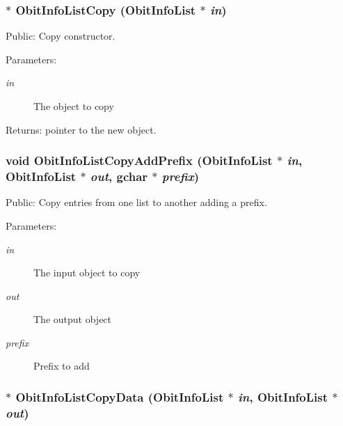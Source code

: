 \subsubsection{$\ast$ Obit\-Info\-List\-Copy ({\bf Obit\-Info\-List} $\ast$ {\em in})}\label{ObitInfoList_8c_a4}


Public: Copy constructor. 

\begin{Desc}
\item[Parameters:]
\begin{description}
\item[{\em in}]The object to copy \end{description}
\end{Desc}
\begin{Desc}
\item[Returns:]pointer to the new object. \end{Desc}
\subsubsection{\setlength{\rightskip}{0pt plus 5cm}void Obit\-Info\-List\-Copy\-Add\-Prefix ({\bf Obit\-Info\-List} $\ast$ {\em in}, {\bf Obit\-Info\-List} $\ast$ {\em out}, gchar $\ast$ {\em prefix})}\label{ObitInfoList_8c_a10}


Public: Copy entries from one list to another adding a prefix. 

\begin{Desc}
\item[Parameters:]
\begin{description}
\item[{\em in}]The input object to copy \item[{\em out}]The output object \item[{\em prefix}]Prefix to add \end{description}
\end{Desc}
\subsubsection{$\ast$ Obit\-Info\-List\-Copy\-Data ({\bf Obit\-Info\-List} $\ast$ {\em in}, {\bf Obit\-Info\-List} $\ast$ {\em out})}\label{ObitInfoList_8c_a7}


